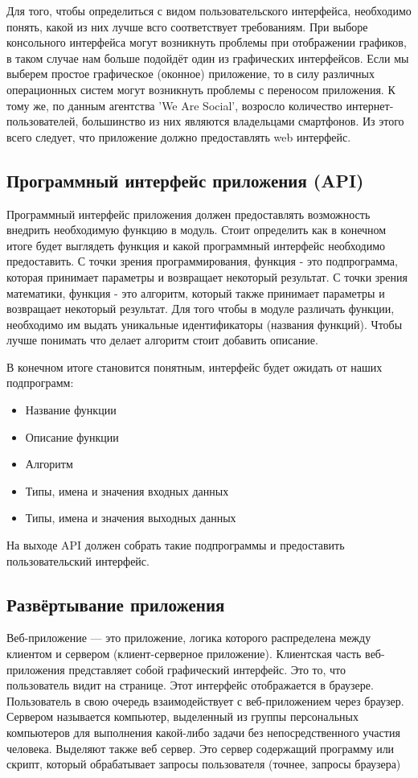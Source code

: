 \documentclass[14pt,a4paper]{scrartcl}
\begin{document}
    Для того, чтобы определиться с видом пользовательского интерфейса, необходимо понять, какой из них лучше всго соответствует требованиям. При выборе консольного интерфейса могут возникнуть проблемы при отображении графиков, в таком случае нам больше подойдёт один из графических интерфейсов. Если мы выберем простое графическое (оконное) приложение, то в силу различных операционных систем могут возникнуть проблемы с переносом приложения. К тому же, по данным агентства 'We Are Social', возросло количество интернет-пользователей, большинство из них являются владельцами смартфонов\cite{Internet-statistic-2018}. Из этого всего следует, что приложение должно предоставлять web интерфейс.

    \subsection[Программный интерфейс приложения]{Программный интерфейс приложения (API)}
    Программный интерфейс приложения должен предоставлять возможность внедрить необходимую функцию в модуль. Стоит определить как в конечном итоге будет выглядеть функция и какой программный интерфейс необходимо предоставить. С точки зрения программирования, функция - это подпрограмма, которая принимает параметры и возвращает некоторый результат. С точки зрения математики, функция - это алгоритм, который также принимает параметры и возвращает некоторый результат. Для того чтобы в модуле различать функции, необходимо им выдать уникальные идентификаторы (названия функций). Чтобы лучше понимать что делает алгоритм стоит добавить описание.

    В конечном итоге становится понятным, интерфейс будет ожидать от наших подпрограмм:
    \begin{itemize}
        \item Название функции
        \item Описание функции
        \item Алгоритм
        \item Типы, имена и значения входных данных
        \item Типы, имена и значения выходных данных
    \end{itemize}
    На выходе API должен собрать такие подпрограммы и предоставить пользовательский интерфейс.

    \subsection[Развёртывание приложения]{Развёртывание приложения}
    Веб-приложение — это приложение, логика которого распределена между клиентом и сервером (клиент-серверное приложение)\cite{Web-app-wiki}. Клиентская часть веб-приложения представляет собой графический интерфейс. Это то, что пользователь видит на странице. Этот интерфейс отображается в браузере. Пользователь в свою очередь взаимодействует с веб-приложением через браузер. Сервером называется компьютер, выделенный из группы персональных компьютеров для выполнения какой-либо задачи без непосредственного участия человека\cite{Server}. Выделяют также веб сервер. Это сервер содержащий программу или скрипт, который обрабатывает запросы пользователя (точнее, запросы браузера)\cite{Web-app-struct}
\end{document}

